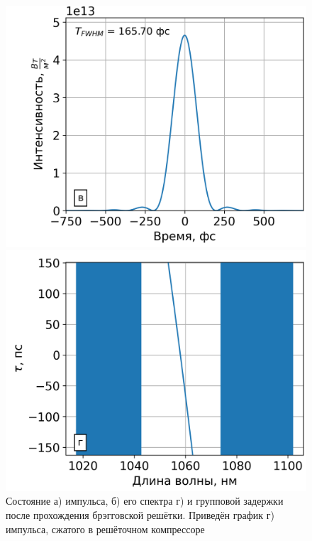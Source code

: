 \documentclass[12pt]{article}
\begin{document}
\begin{figure}[h!]
  \vspace{}

  \begin{minipage}[b]{0.5\textwidth}
    \includegraphics[width=\linewidth]{Images/Gauss Pulse/После компрессора/4 элемент gamma=49.41509 l_g=0.36344 сжатие}
  \end{minipage}%
  \begin{minipage}[b]{0.5\textwidth}
    \includegraphics[width=\linewidth]{Images/Gauss Pulse/Импульс и спектр/!4. BFG_time_delay}
  \end{minipage}

  \caption{Состояние а) импульса, б) его спектра г) и групповой задержки после прохождения брэгговской решётки. Приведён
  график г) импульса, сжатого в решёточном компрессоре}
  \label{fig:both}
\end{figure}
\end{document}

